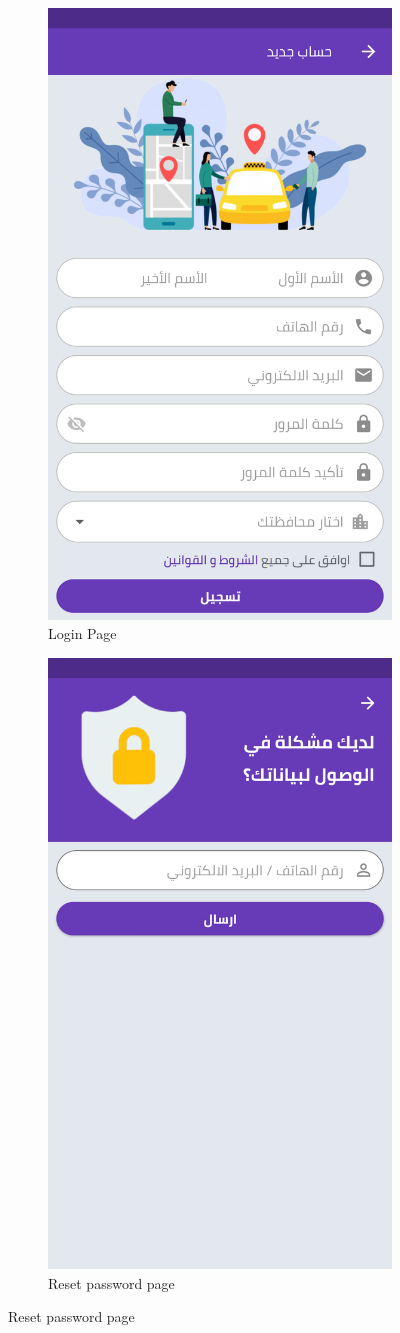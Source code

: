 \begin{figure}[H]
\begin{subfigure}[b]{0.5\linewidth}
  \end{subfigure}%
      \begin{subfigure}[b]{0.5\linewidth}
    \centering
    \includegraphics[width=0.4\linewidth]{images/ch3/login/1.png}
   \caption{ Login Page}
  \end{subfigure}%

    \caption{ Login and Registration Page}
\begin{figure}
    \centering
      \includegraphics[width=0.5\linewidth]{images/ch3/login/2.png}
    \caption{ Reset password page }
    \label{fig:my_label}
\end{figure}
  \end{figure}


